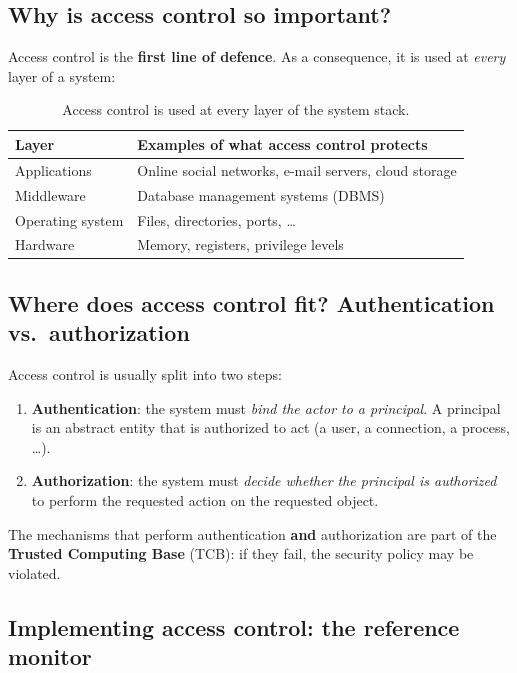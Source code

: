 \subsection{Why is access control so important?}

Access control is the \textbf{first line of defence}. As a consequence, it is used at \emph{every} layer of a system:

\begin{table}[h]
\centering
\begin{tabular}{@{}p{3.2cm}p{9.5cm}@{}}
\toprule
\textbf{Layer} & \textbf{Examples of what access control protects} \\
\midrule
Applications & Online social networks, e-mail servers, cloud storage \\
Middleware & Database management systems (DBMS) \\
Operating system & Files, directories, ports, \dots \\
Hardware & Memory, registers, privilege levels \\
\bottomrule
\end{tabular}
\caption{Access control is used at every layer of the system stack.}
\end{table}

\subsection{Where does access control fit? Authentication vs.\ authorization}

Access control is usually split into two steps:

\begin{enumerate}
    \item \textbf{Authentication}: the system must \emph{bind the actor to a principal}. A principal is an abstract entity that is authorized to act (a user, a connection, a process, \dots).  
    \item \textbf{Authorization}: the system must \emph{decide whether the principal is authorized} to perform the requested action on the requested object.
\end{enumerate}

\begin{remark}
The mechanisms that perform authentication \textbf{and} authorization are part of the \textbf{Trusted Computing Base} (TCB): if they fail, the security policy may be violated.
\end{remark}

\subsection{Implementing access control: the reference monitor}

